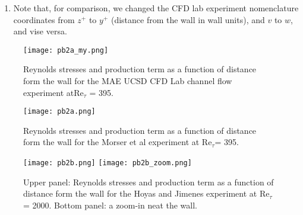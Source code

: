 \documentclass[11pt]{article}
\begin{document}
\begin{enumerate}[label=(\alph*)]
    \item Note that, for comparison, we changed the CFD lab experiment nomenclature coordinates from $z^+$ to $y^+$ (distance from the wall in wall units), and $v$ to $w$, and vise versa.
\end{enumerate}

\begin{figure}[ht]
\begin{center}
\texttt{[image: pb2a\_my.png]}\\
\end{center}
\caption{Reynolds stresses and production term as a function of distance form the wall for the MAE UCSD CFD Lab channel flow experiment atRe$_\tau$ = 395.}
\label{fig:my_stress}
\end{figure}


\begin{figure}[ht]
\begin{center}
\texttt{[image: pb2a.png]}\\
\end{center}
\caption{Reynolds stresses and production term as a function of distance form the wall for the Morser et al experiment at Re$_\tau$= 395.}
\label{fig:stress}
\end{figure}

\begin{figure}[ht]
\begin{center}
\texttt{[image: pb2b.png]}
\texttt{[image: pb2b\_zoom.png]}
\end{center}
\caption{Upper panel: Reynolds stresses and production term as a function of distance form the wall for the Hoyas and Jimenes experiment at Re$_\tau$ = 2000. Bottom panel: a zoom-in neat the wall.}
\label{fig:stress2}
\end{figure}
\end{document}
